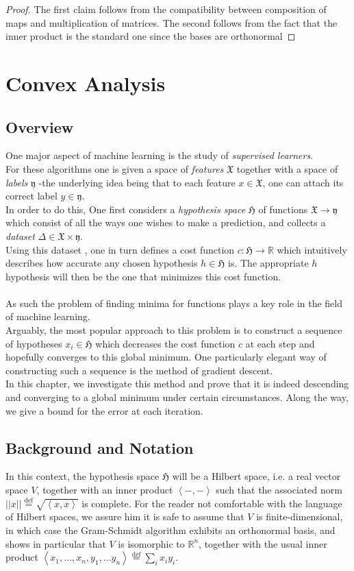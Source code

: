 \documentclass{book}
\theoremstyle{plain}
\theoremstyle{definition}
\newcommand{\bl}[2]{\left\langle #1,#2\right\rangle}
\renewcommand{\d}[1]{\mathbb{#1}}
\newcommand{\define}{\stackrel{\operatorname{def}}{=}}
\newcommand{\f}[1]{\mathfrak{#1}}
\newcommand{\norm}[1]{\vert \vert #1 \vert \vert}
\newcommand{\mor}{\longrightarrow}
\begin{document}
\begin{proof}
	The first claim follows from the compatibility between composition of maps and multiplication of matrices. The second follows from the fact that the inner product is the standard one since the bases are orthonormal
\end{proof}

\chapter{Convex Analysis}



\section{Overview}
One major aspect of machine learning is the study of \emph{supervised learners}. \\
For these algorithms one is given a space of \emph{features} $\f{X}$ together with a space of \emph{labels} $\f{y}$ -the underlying idea being that to each feature $x \in \f{X}$, one can attach its correct label $y \in \f{y}$.\\ 
In order to do this, One first considers a \emph{hypothesis space} $\f{H}$ of functions $\f{X}\mor \f{y}$ which consist of all the ways one wishes to make a prediction, and collects a \emph{dataset} $\Delta \in \f{X}\times \f{y}$.\\
 Using this dataset , one in turn defines a cost function $c: \f{H}\mor \d{R}$ which intuitively describes how accurate any chosen hypothesis $h \in \f{H}$ is. The appropriate $h$ hypothesis will then be the one that minimizes this cost function.\\\\
As such the problem of finding minima for functions plays a key role in the field of machine learning.\\
Arguably, the most popular approach to this problem is to construct a sequence of hypotheses $x_i \in \f{H}$ which decreases the cost function $c$ at each step and hopefully converges to this global minimum. One particularly elegant way of constructing such a sequence is the method of gradient descent.\\
In this chapter, we investigate this method and prove that it is indeed descending and converging to a global minimum under certain circumstances. Along the way, we give a bound for the error at each iteration.
\newpage
\section{Background and Notation}
In this context, the hypothesis space $\f{H}$ will be a Hilbert space, i.e. a real vector space $V$, together with an inner product $\bl{-}{-}$ such that the associated norm $\norm{x}\define \sqrt{\bl{x}{x}}$  is complete. For the reader not comfortable with the language of Hilbert spaces,  we assure him it is safe to assume that $V$ is finite-dimensional, in which case the Gram-Schmidt algorithm exhibits an orthonormal basis, and shows in particular that  $V$ is isomorphic to $\d{R}^n$, together with the usual inner product $\bl{x_1,\ldots , x_n}{y_1,\ldots y_n}\define \sum_i x_iy_i$.\\
\end{document}
